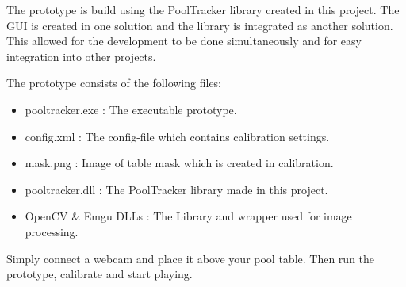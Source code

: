 The prototype is build using the PoolTracker library created in this project. The GUI is created in one solution and the library is integrated as another solution. This allowed for the development to be done simultaneously and for easy integration into other projects.

The prototype consists of the following files:
\begin{itemize}
\setlength{\itemsep}{0mm}
	\item pooltracker.exe : The executable prototype.
	\item config.xml	  : The config-file which contains calibration settings.
	\item mask.png		  : Image of table mask which is created in calibration.
	\item pooltracker.dll : The PoolTracker library made in this project.
	\item OpenCV \& Emgu DLLs  : The Library and wrapper used for image processing.
\end{itemize}

Simply connect a webcam and place it above your pool table. Then run the prototype, calibrate and start playing.